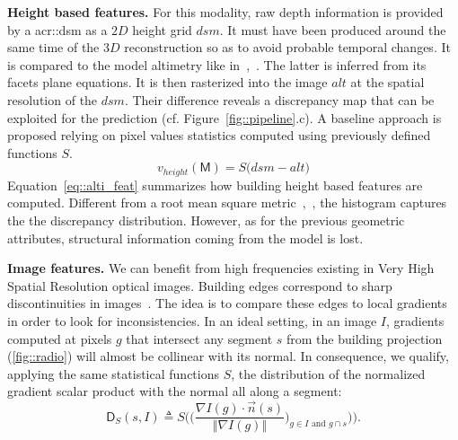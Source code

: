 \documentclass[runningheads]{llncs}
\begin{document}
\noindent
\textbf{Height based features.}
For this modality, raw depth information is provided by a \acrlong{acr::dsm} as a $2D$ height grid $dsm$. It must have been produced around the same time of the $3D$ reconstruction so as to avoid probable temporal changes. It is compared to the model altimetry like in~\cite{Bredif2007},~\cite{zebedin2008fusion}. The latter is inferred from its facets plane equations. It is then rasterized into the image $alt$ at the spatial resolution of the $dsm$. Their difference reveals a discrepancy map that can be exploited for the prediction (cf. Figure~\ref{fig::pipeline}.c). A baseline approach is proposed relying on pixel values statistics computed using previously defined functions $S$.
\begin{equation}
	\label{eq::alti_feat}
    v_{height}(\mathsf{M}) = S\big( dsm - alt \big)
\end{equation}
Equation~\ref{eq::alti_feat} summarizes how building height based features are computed. Different from a root mean square metric~\cite{lafarge2012creating},~\cite{Poullis2013}, the histogram captures the the discrepancy distribution. However, as for the previous geometric attributes, structural information coming from the model is lost.

\noindent
\textbf{Image features.} We can benefit from high frequencies existing in Very High Spatial Resolution optical images.
Building edges correspond to sharp discontinuities in images~\cite{ortner2007building}. The idea is to compare these edges to local gradients in order to look for inconsistencies. In an ideal setting, in an image $I$, gradients computed at pixels $g$ that intersect any segment $s$ from the building projection (\ref{fig::radio}) will almost be collinear with its normal. In consequence, we qualify, applying the same statistical functions $S$, the distribution of the normalized gradient scalar product with the normal all along a segment:
\begin{equation}
	\label{eq::corr_seg}
    \mathsf{D}_S(s, I) \triangleq S \bigg( \Big(\frac{\nabla I(g) \cdot \vec{n}(s)}{\Vert \nabla I(g)\Vert})_{g \in I \textrm{ and } g \cap s} \Big)\bigg).
\end{equation}
\end{document}
